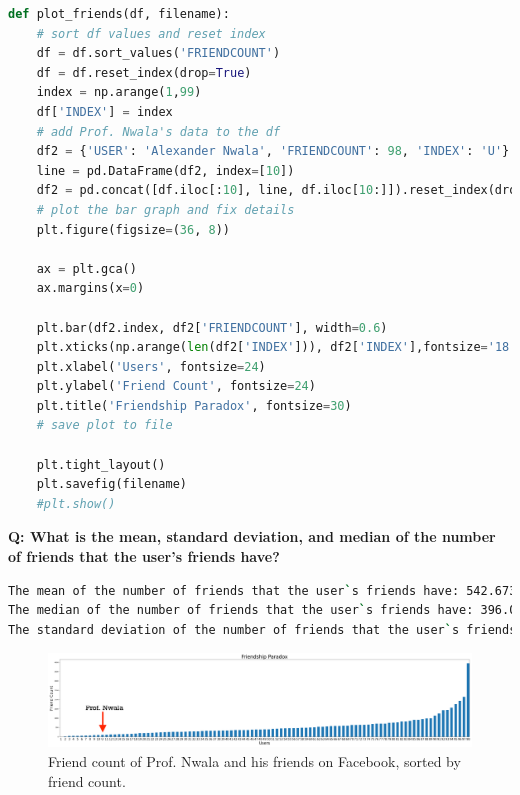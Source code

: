 \documentclass[12pt]{article}
\begin{document}
\begin{lstlisting}[language=python, caption=plotting Prof. Nwala's Facebook friends' friend count, label=lst:copy]
def plot_friends(df, filename):
    # sort df values and reset index
    df = df.sort_values('FRIENDCOUNT')
    df = df.reset_index(drop=True)
    index = np.arange(1,99)
    df['INDEX'] = index
    # add Prof. Nwala's data to the df
    df2 = {'USER': 'Alexander Nwala', 'FRIENDCOUNT': 98, 'INDEX': 'U'}
    line = pd.DataFrame(df2, index=[10])
    df2 = pd.concat([df.iloc[:10], line, df.iloc[10:]]).reset_index(drop=True)
    # plot the bar graph and fix details
    plt.figure(figsize=(36, 8))

    ax = plt.gca()
    ax.margins(x=0)

    plt.bar(df2.index, df2['FRIENDCOUNT'], width=0.6)
    plt.xticks(np.arange(len(df2['INDEX'])), df2['INDEX'],fontsize='18')
    plt.xlabel('Users', fontsize=24)
    plt.ylabel('Friend Count', fontsize=24)
    plt.title('Friendship Paradox', fontsize=30)
    # save plot to file

    plt.tight_layout()
    plt.savefig(filename)
    #plt.show()
\end{lstlisting}

\noindent\textbf{Q: What is the mean, standard deviation, and median of the number of friends that the user's friends have?}

\begin{lstlisting}[language=bash, caption=summary statistics for Facebook friends, label=lst:copy]
The mean of the number of friends that the user`s friends have: 542.6734693877551
The median of the number of friends that the user`s friends have: 396.0
The standard deviation of the number of friends that the user`s friends have: 536.6744685696292
\end{lstlisting}

\begin{figure}[h]
    \centering
    \includegraphics[width=\textwidth, scale=1.5]
    {friendship_paradox_barplot2.png}
    \caption{Friend count of Prof. Nwala and his friends on Facebook, sorted by friend count.}
    \label{fig:friendship-paradox}
\end{figure}
\end{document}

